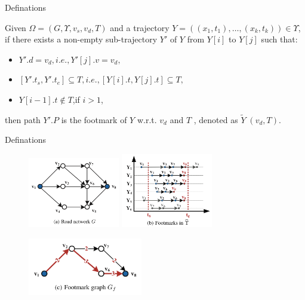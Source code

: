 \documentclass[mathserif]{beamer}
\begin{document}
\begin{frame}{Definations}
\begin{defination}
Given $\Omega{} = (G, \Upsilon{}, v_s,v_d,T)$ and a trajectory $Y = ((x_1, t_1), \ldots{} , (x_k, t_k)) \in{} \Upsilon{}$, if there exists a non-empty sub-trajectory $Y'$ of $Y$ from $Y[i]$ to $Y[j]$ such that:\
	\begin{itemize}
		\item $Y'.d = v_d, i.e., Y'[j].v=v_d,$
		\item $[Y'.t_s,Y'.t_e]\subseteq{} T,i.e.,[Y[i].t,Y[j].t]\subseteq{} T,$
		\item $Y[i−1].t\notin{} T$,if $i>1$,
	\end{itemize}
	then path $Y'.P$ is the footmark of $Y$ w.r.t. $v_d$ and $T$ , denoted as $\widetilde{Y}􏰀 (v_d ,T)$.
\end{defination}
\end{frame}

\begin{frame}{Definations}
\begin{figure}
\includegraphics[width=4cm]{pic1.png}
\includegraphics[width=4cm]{pic2.png}
\end{figure}
\begin{figure}
\includegraphics[width=5cm]{pic3.png}
\end{figure}
\end{frame}
\end{document}
